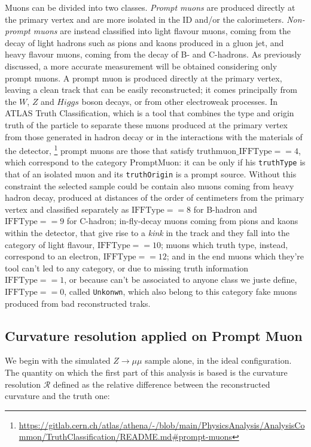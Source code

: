 \documentclass[11pt,a4paper,twoside,openright]{report}
\begin{document}
Muons can be divided into two classes. \emph{Prompt muons} are produced directly at the primary vertex and are more isolated in the ID and/or the calorimeters. \emph{Non-prompt muons} are instead classified into light flavour muons, coming from the decay of light hadrons such as pions and kaons produced in a gluon jet, and heavy flavour muons, coming from the decay of B- and C-hadrons. As previously discussed, a more accurate measurement will be obtained considering only prompt muons. A prompt muon is produced directly at the primary vertex, leaving a clean track that can be easily reconstructed; it comes principally from the \(W\), \(Z\) and \(Higgs\) boson decays, or from other electroweak processes. In ATLAS Truth Classification, which is a tool that combines the type and origin truth of the particle to separate these muons produced at the primary vertex from those generated in hadron decay or in the interactions with the materials of the detector, \footnote{\url{https://gitlab.cern.ch/atlas/athena/-/blob/main/PhysicsAnalysis/AnalysisCommon/TruthClassification/README.md\#prompt-muons}} prompt muons are those that satisfy \(\text{truthmuon\_IFFType} == 4\), which correspond to the category PromptMuon: it can be only if his \texttt{truthType} is that of an isolated muon and its \texttt{truthOrigin} is a prompt source. Without this constraint the selected sample could be contain also muons coming from heavy hadron decay, produced at distances of the order of centimeters from the primary vertex and classified separately as \(\text{IFFType} == 8\) for B-hadron and \(\text{IFFType} == 9\)  for C-hadron; in-fly-decay muons coming from pions and kaons within the detector, that give rise to a \emph{kink} in the track and they fall into the category of light flavour, \(\text{IFFType} == 10\); muons which truth type, instead, correspond to an electron, \(\text{IFFType} == 12\); and in the end muons which they're tool can't led to any category, or due to missing truth information \(\text{IFFType} == 1\), or because can't be associated to anyone class we juste define, \(\text{IFFType} == 0\), called \texttt{Unkonwn}, which also belong to this category fake muons produced from bad reconstructed traks.

\subsection{Curvature resolution applied on Prompt Muon}

We begin with the simulated $Z\rightarrow\mu\mu$ sample alone, in the ideal configuration. The quantity on which the first part of this analysis is based is the curvature resolution $\mathcal{R}$ defined as the relative difference between the reconstructed curvature and the truth one:
\end{document}
